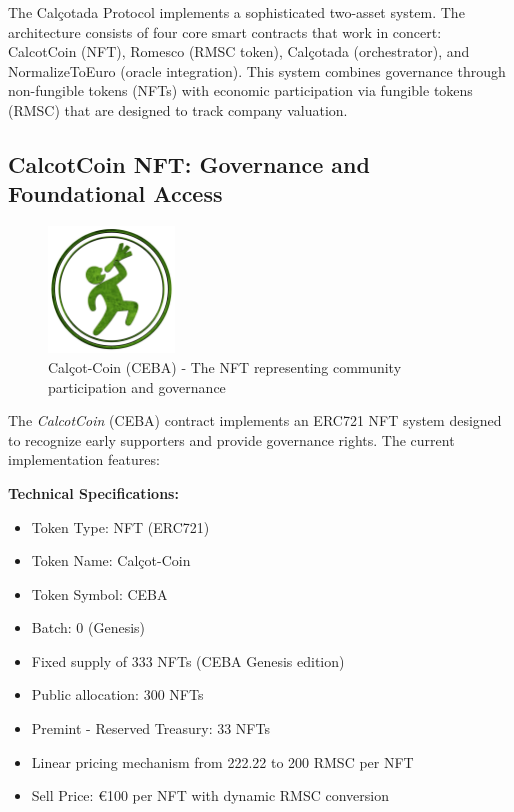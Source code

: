 \documentclass[conference]{IEEEtran}
\begin{document}


The Calçotada Protocol implements a sophisticated two-asset system. The architecture consists of four core smart contracts that work in concert: CalcotCoin (NFT), Romesco (RMSC token), Calçotada (orchestrator), and NormalizeToEuro (oracle integration). This system combines governance through non-fungible tokens (NFTs) with economic participation via fungible tokens (RMSC) that are designed to track company valuation.

\subsection{CalcotCoin NFT: Governance and Foundational Access}

\begin{figure}[ht]
\centering
\includegraphics[width=0.3\textwidth]{calcot-coin-logo.png}
\caption{Calçot-Coin (CEBA) - The NFT representing community participation and governance}
\label{fig:calcotcoin-logo}
\end{figure}

The \textit{CalcotCoin} (CEBA) contract implements an ERC721 NFT system designed to recognize early supporters and provide governance rights. The current implementation features:

\textbf{Technical Specifications:}
\begin{itemize}
    \item Token Type: NFT (ERC721)
    \item Token Name: Calçot-Coin
    \item Token Symbol: CEBA
    \item Batch: 0 (Genesis)
    \item Fixed supply of 333 NFTs (CEBA Genesis edition)
    \item Public allocation: 300 NFTs
    \item Premint - Reserved Treasury: 33 NFTs
    \item Linear pricing mechanism from 222.22 to 200 RMSC per NFT
    \item Sell Price: €100 per NFT with dynamic RMSC conversion
\end{itemize}
\end{document}
